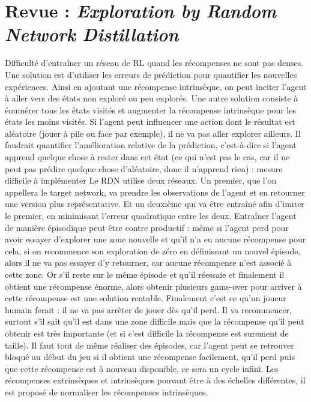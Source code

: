\documentclass[a4paper,12pt]{report}
\begin{document}
\newpage \section{Revue : \textit{Exploration by Random Network Distillation} \cite{distillation}}
\label{revue_distillation}
\indent Difficulté d'entraîner un réseau de RL quand les récompenses ne sont pas denses.
\newline \indent  Une solution est d’utiliser les erreurs de prédiction pour quantifier les nouvelles expériences. Ainsi en ajoutant une récompense intrinsèque, on peut inciter l’agent à aller vers des états non exploré ou peu explorés. Une autre solution consiste à énumérer tous les états visités et augmenter la récompense intrinsèque pour les états les moins visités.
\newline \indent  Si l’agent peut influencer une action dont le résultat est aléatoire (jouer à pile ou face par exemple), il ne va pas aller explorer ailleurs. Il faudrait quantifier l’amélioration relative de la prédiction, c’est-à-dire si l’agent apprend quelque chose à rester dans cet état (ce qui n’est pas le cas, car il ne peut pas prédire quelque chose d’aléatoire, donc il n’apprend rien) : mesure difficile à implémenter
\newline \indent  Le RDN utilise deux réseaux. Un premier, que l’on appellera le target network, va prendre les observations de l’agent et en retourner une version plus représentative. Et un deuxième qui va être entraîné afin d’imiter le premier, en minimisant l’erreur quadratique entre les deux.
\newline \indent  Entraîner l’agent de manière épisodique peut être contre productif :    même si l’agent perd pour avoir essayer d’explorer une zone nouvelle et qu’il n’a eu aucune récompense pour cela, si on recommence son exploration de zéro en définissant un nouvel épisode, alors il ne va pas essayer d’y retourner, car aucune récompense n’est associé à cette zone. Or s’il reste sur le même épisode et qu’il réessaie et finalement il obtient une récompense énorme, alors obtenir plusieurs game-over pour arriver à cette récompense est une solution rentable. Finalement c’est ce qu’un joueur humain ferait : il ne va pas arrêter de jouer dès qu’il perd. Il va recommencer, surtout s’il sait qu’il est dans une zone difficile mais que la récompense qu’il peut obtenir est très importante (et si c’est difficile la récompense est surement de taille). Il faut tout de même réaliser des épisodes, car l’agent peut se retrouver bloqué au début du jeu si il obtient une récompense facilement, qu’il perd puis que cette récompense est à nouveau disponible, ce sera un cycle infini.
\newline \indent  Les récompenses extrinsèques et intrinsèques pouvant être à des échelles différentes, il est proposé de normaliser les récompenses intrinsèques.
\end{document}
